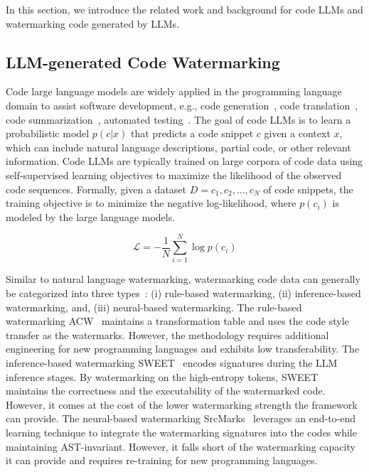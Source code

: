 In this section, we introduce the related work and background for code LLMs and watermarking code generated by LLMs.

\subsection{LLM-generated Code Watermarking}
Code large language models are widely applied in the programming language domain to assist software development, e.g., code generation~\cite{copilot,roziere2023code,luo2023wizardcoder}, code translation~\cite{pan2023understanding,roziere2021leveraging}, code summarization~\cite{ahmed2022few,gao2023makes}, automated testing~\cite{yu2023llm,kang2023large}. 
The goal of code LLMs is to learn a probabilistic model $p(c|x)$ that predicts a code snippet $c$ given a context $x$, which can include natural language descriptions, partial code, or other relevant information. Code LLMs are typically trained on large corpora of code data using self-supervised learning objectives to maximize the likelihood of the observed code sequences. Formally, given a dataset $D = {c_1, c_2, ..., c_N}$ of code snippets, the training objective is to minimize the negative log-likelihood, where $p(c_i)$ is modeled by the large language models.

\begin{equation}
\mathcal{L} = -\frac{1}{N}\sum_{i=1}^{N}\log p(c_i)
\end{equation}


Similar to natural language watermarking, watermarking code data can generally be categorized into three types~\cite{zhang2023remark}: (i) rule-based watermarking, (ii) inference-based watermarking, and, (iii) neural-based watermarking.  
The rule-based watermarking ACW~\cite{li2024resilient} maintains a transformation table and uses the code style transfer as the watermarks. However, the methodology requires additional engineering for new programming languages and exhibits low transferability. The inference-based watermarking SWEET~\cite{lee2023wrote} encodes signatures during the LLM inference stages. By watermarking on the high-entropy tokens, SWEET~\cite{lee2023wrote} maintains the correctness and the executability of the watermarked code. However, it comes at the cost of the lower watermarking strength the framework can provide. The neural-based watermarking SrcMarks~\cite{yang2023towards} leverages an end-to-end learning technique to integrate the watermarking signatures into the codes while maintaining AST-invariant.
However, it falls short of the watermarking capacity it can provide and requires re-training for new programming languages.  


